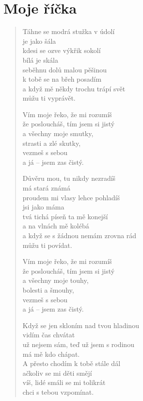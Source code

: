 \section{Moje říčka}

\thispagestyle{empty}

\begin{multicols}{2}

\begin{verse}

Táhne se modrá stužka v údolí\\
je jako šála\\
kdesi se ozve výkřik sokolí\\
bílá je skála\\
seběhnu dolů malou pěšinou\\
k tobě se na břeh posadím\\
a když mě někdy trochu trápí svět\\
můžu ti vyprávět.
 
Vím moje řeko, že mi rozumíš\\
že posloucháš, tím jsem si jistý\\
a všechny moje smutky,\\
strasti a zlé skutky,\\
vezmeš s sebou\\
a já – jsem zas čistý.
 
Důvěru mou, tu nikdy nezradíš\\
má stará známá\\
proudem mi vlasy lehce pohladíš\\
jsi jako máma\\
tvá tichá píseň ta mě konejší\\
a na vlnách mě kolébá\\
a když se s žádnou nemám zrovna rád\\
můžu ti povídat.
 
Vím moje řeko, že mi rozumíš\\
že posloucháš, tím jsem si jistý\\
a všechny moje touhy,\\
bolesti a šmouhy,\\
vezmeš s sebou\\
a já – jsem zas čistý.

\columnbreak

Když se jen skloním nad tvou hladinou\\
vidím čas chvátat\\
už nejsem sám, teď už jsem s rodinou\\
má mě kdo chápat.\\
A přesto chodím k tobě stále dál\\
ačkoliv se mi děti smějí\\
víš, lidé smáli se mi tolikrát\\
chci s tebou vzpomínat.
 

\end{verse}
\end{multicols}

